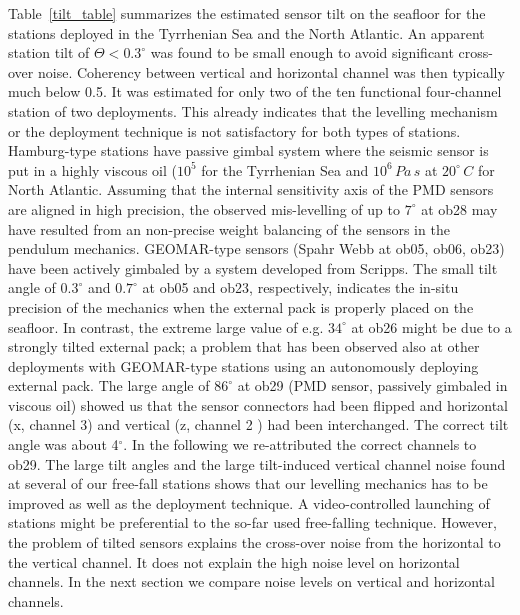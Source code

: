 \documentclass{article}
\begin{document}
{%
Table~\ref{tilt_table} summarizes the estimated sensor 
tilt on the seafloor for the stations deployed in the 
Tyrrhenian Sea and the North Atlantic.
An apparent  station tilt of $\Theta < 0.3^{\circ}$
was found to be small enough to avoid significant cross-over noise.
Coherency between vertical and horizontal channel was then 
typically much below 0.5.
It was estimated for only two of the 
ten functional four-channel station of two deployments.
This already indicates that the levelling mechanism or the 
deployment technique 
is not satisfactory for both types of stations.
Hamburg-type stations have passive gimbal system where the 
seismic sensor is put in a highly viscous oil 
($10^5$ for the Tyrrhenian Sea and $10^6 \, Pa\,s$ at $20^{\circ}\, C$ for North Atlantic.
Assuming that the internal sensitivity axis of the PMD sensors are 
aligned in high precision, 
the observed mis-levelling of up to $7^{\circ}$ at ob28 
may have resulted from 
an non-precise weight balancing of the sensors in
the pendulum mechanics. 
GEOMAR-type sensors (Spahr Webb at ob05, ob06, ob23) 
have been actively gimbaled by a system developed from Scripps.
The small tilt angle of $0.3^{\circ}$
and $0.7^{\circ}$ at ob05 and ob23, respectively, indicates
the in-situ precision of the mechanics when the external pack 
is properly placed on the seafloor.
In contrast, the extreme large value
of e.g. $34^{\circ}$ at ob26 might be due to a strongly 
tilted external pack; a problem that has been observed also 
at other deployments with GEOMAR-type stations using an 
autonomously deploying external pack.
The large angle of $86^{\circ}$ at ob29
(PMD sensor, passively gimbaled in viscous oil) 
showed us that the sensor connectors had been flipped and 
horizontal (x, channel 3) and vertical (z, channel 2 ) 
had been interchanged.
The correct tilt angle was about 4$^{\circ}$.
In the following we re-attributed the correct channels
to ob29.
The large tilt angles and the large tilt-induced vertical channel 
noise found at several of our free-fall stations shows  
that our levelling mechanics has to be improved as well 
as the deployment technique. 
A video-controlled launching of stations might be 
preferential to the so-far used 
free-falling technique.
However, the problem of tilted sensors explains the 
cross-over noise from the horizontal to the vertical 
channel. It does not explain the high noise level on
horizontal channels. 
In the next section we compare noise levels
on vertical and horizontal channels.


}
\end{document}
